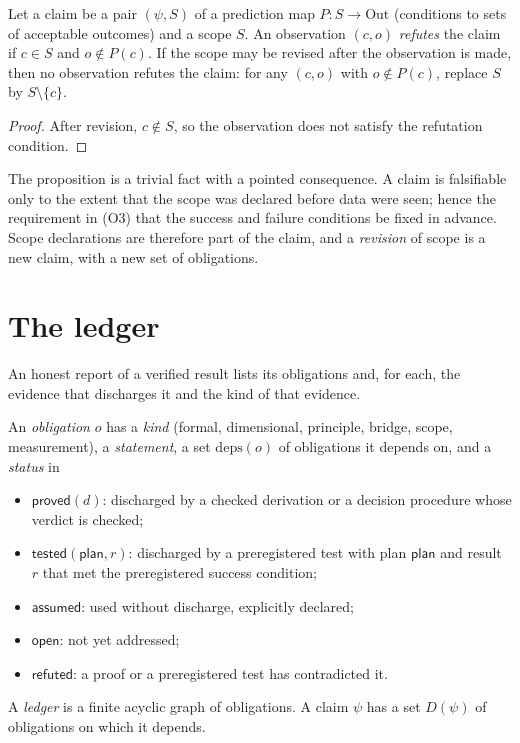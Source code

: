 \begin{proposition}
\label{prop:scope}
Let a claim be a pair $(\psi,S)$ of a prediction map $P:S\to\mathrm{Out}$ (conditions to sets of acceptable outcomes) and a scope $S$. An observation $(c,o)$ \emph{refutes} the claim if $c\in S$ and $o\notin P(c)$. If the scope may be revised after the observation is made, then no observation refutes the claim: for any $(c,o)$ with $o\notin P(c)$, replace $S$ by $S\setminus\{c\}$.
\end{proposition}

\begin{proof}
After revision, $c\notin S$, so the observation does not satisfy the refutation condition.
\end{proof}

The proposition is a trivial fact with a pointed consequence. A claim is falsifiable only to the extent that the scope was declared before data were seen; hence the requirement in (O3) that the success and failure conditions be fixed in advance. Scope declarations are therefore part of the claim, and a \emph{revision} of scope is a new claim, with a new set of obligations.

\section{The ledger}
\label{sec:ledger}

An honest report of a verified result lists its obligations and, for each, the evidence that discharges it and the kind of that evidence.

\begin{definition}
\label{def:ledger}
An \emph{obligation} $o$ has a \emph{kind} (formal, dimensional, principle, bridge, scope, measurement), a \emph{statement}, a set $\mathrm{deps}(o)$ of obligations it depends on, and a \emph{status} in
\begin{itemize}[nosep]
\item $\mathsf{proved}(d)$: discharged by a checked derivation or a decision procedure whose verdict is checked;
\item $\mathsf{tested}(\mathsf{plan},r)$: discharged by a preregistered test with plan $\mathsf{plan}$ and result $r$ that met the preregistered success condition;
\item $\mathsf{assumed}$: used without discharge, explicitly declared;
\item $\mathsf{open}$: not yet addressed;
\item $\mathsf{refuted}$: a proof or a preregistered test has contradicted it.
\end{itemize}
A \emph{ledger} is a finite acyclic graph of obligations. A claim $\psi$ has a set $D(\psi)$ of obligations on which it depends.
\end{definition}

